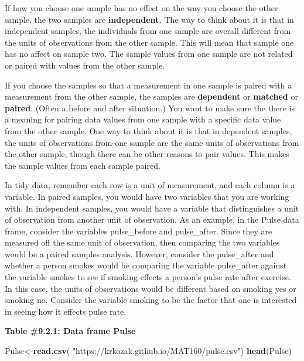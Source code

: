 \documentclass[
]{book}
\newenvironment{Shaded}{\begin{snugshade}}{\end{snugshade}}
\newcommand{\KeywordTok}[1]{\textcolor[rgb]{0.13,0.29,0.53}{\textbf{#1}}}
\newcommand{\NormalTok}[1]{#1}
\newcommand{\StringTok}[1]{\textcolor[rgb]{0.31,0.60,0.02}{#1}}
\begin{document}
If how you choose one sample has no effect on the way you choose the other sample, the two samples are \textbf{independent.} The way to think about it is that in independent samples, the individuals from one sample are overall different from the units of observations from the other sample. This will mean that sample one has no affect on sample two. The sample values from one sample are not related or paired with values from the other sample.

If you choose the samples so that a measurement in one sample is paired with a measurement from the other sample, the samples are \textbf{dependent} or \textbf{matched} or \textbf{paired}. (Often a before and after situation.) You want to make sure the there is a meaning for pairing data values from one sample with a specific data value from the other sample. One way to think about it is that in dependent samples, the units of observations from one sample are the same units of observations from the other sample, though there can be other reasons to pair values. This makes the sample values from each sample paired.

In tidy data, remember each row is a unit of measurement, and each column is a variable. In paired samples, you would have two variables that you are working with. In independent samples, you would have a variable that distinguishes a unit of observation from another unit of observation. As an example, in the Pulse data frame, consider the variables pulse\_before and pulse\_after. Since they are measured off the same unit of observation, then comparing the two variables would be a paired samples analysis. However, consider the pulse\_after and whether a person smokes would be comparing the variable pulse\_after against the variable smokes to see if smoking effects a person's pulse rate after exercise. In this case, the units of observations would be different based on smoking yes or smoking no. Consider the variable smoking to be the factor that one is interested in seeing how it effects pulse rate.

\textbf{Table \#9.2.1: Data frame Pulse}

\begin{Shaded}
\begin{Highlighting}[]
\NormalTok{Pulse<-}\KeywordTok{read.csv}\NormalTok{(}
  \StringTok{"https://krkozak.github.io/MAT160/pulse.csv"}\NormalTok{)}
\KeywordTok{head}\NormalTok{(Pulse)}
\end{Highlighting}
\end{Shaded}
\end{document}
